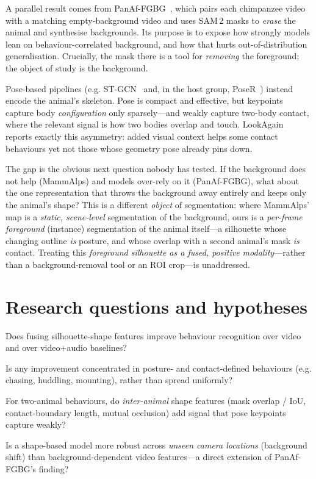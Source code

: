 \documentclass[11pt]{article}
\begin{document}
A parallel result comes from PanAf-FGBG~\cite{panaf}, which pairs each chimpanzee video with a matching empty-background video and uses SAM\,2 masks to \emph{erase} the animal and synthesise backgrounds. Its purpose is to expose how strongly models lean on behaviour-correlated background, and how that hurts out-of-distribution generalisation. Crucially, the mask there is a tool for \emph{removing} the foreground; the object of study is the background.

Pose-based pipelines (e.g. ST-GCN~\cite{stgcn} and, in the host group, PoseR~\cite{poser}) instead encode the animal's skeleton. Pose is compact and effective, but keypoints capture body \emph{configuration} only sparsely---and weakly capture two-body contact, where the relevant signal is how two bodies overlap and touch. LookAgain~\cite{lookagain} reports exactly this asymmetry: added visual context helps some contact behaviours yet not those whose geometry pose already pins down.

The gap is the obvious next question nobody has tested. If the background does not help (MammAlps) and models over-rely on it (PanAf-FGBG), what about the one representation that throws the background away entirely and keeps only the animal's shape? This is a different \emph{object} of segmentation: where MammAlps' map is a \emph{static, scene-level} segmentation of the background, ours is a \emph{per-frame foreground} (instance) segmentation of the animal itself---a silhouette whose changing outline \emph{is} posture, and whose overlap with a second animal's mask \emph{is} contact. Treating this \emph{foreground silhouette as a fused, positive modality}---rather than a background-removal tool or an ROI crop---is unaddressed.

\section{Research questions and hypotheses}
\begin{description}[leftmargin=2.2em,style=nextline]
  \item[RQ1 (does it help?)] Does fusing silhouette-shape features improve behaviour recognition over video and over video+audio baselines?
  \item[RQ2 (where?)] Is any improvement concentrated in posture- and contact-defined behaviours (e.g. chasing, huddling, mounting), rather than spread uniformly?
  \item[RQ3 (contact geometry)] For two-animal behaviours, do \emph{inter-animal} shape features (mask overlap / IoU, contact-boundary length, mutual occlusion) add signal that pose keypoints capture weakly?
  \item[RQ4 (robustness)] Is a shape-based model more robust across \emph{unseen camera locations} (background shift) than background-dependent video features---a direct extension of PanAf-FGBG's finding?
\end{description}
\end{document}
